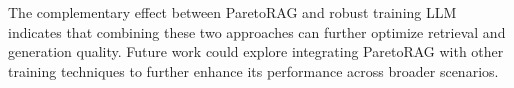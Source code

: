 The complementary effect between ParetoRAG and robust training LLM indicates that combining these two approaches can further optimize retrieval and generation quality. Future work could explore integrating ParetoRAG with other training techniques to further enhance its performance across broader scenarios.
%         
%         









